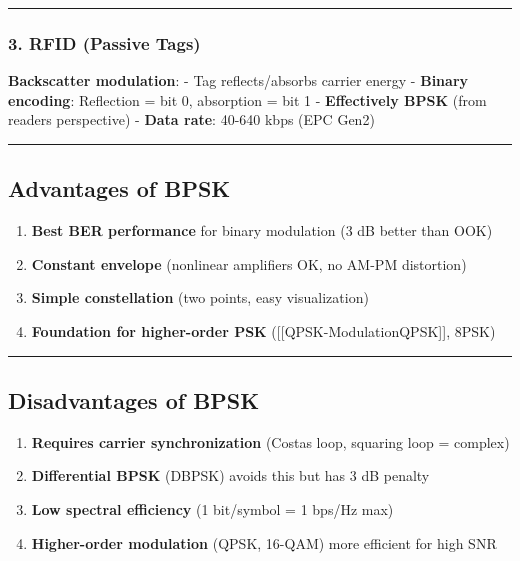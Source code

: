 \begin{center}\rule{0.5\linewidth}{0.5pt}\end{center}

\subsubsection{3. RFID (Passive Tags)}\label{rfid-passive-tags}

\textbf{Backscatter modulation}: - Tag reflects/absorbs carrier energy -
\textbf{Binary encoding}: Reflection = bit 0, absorption = bit 1 -
\textbf{Effectively BPSK} (from reader\textquotesingle s perspective) -
\textbf{Data rate}: 40-640 kbps (EPC Gen2)

\begin{center}\rule{0.5\linewidth}{0.5pt}\end{center}

\subsection{Advantages of BPSK}\label{advantages-of-bpsk}

\begin{enumerate}
\def\labelenumi{\arabic{enumi}.}
\tightlist
\item
  \textbf{Best BER performance} for binary modulation (3 dB better than
  OOK)
\item
  \textbf{Constant envelope} (nonlinear amplifiers OK, no AM-PM
  distortion)
\item
  \textbf{Simple constellation} (two points, easy visualization)
\item
  \textbf{Foundation for higher-order PSK}
  ({[}{[}QPSK-Modulation\textbar QPSK{]}{]}, 8PSK)
\end{enumerate}

\begin{center}\rule{0.5\linewidth}{0.5pt}\end{center}

\subsection{Disadvantages of BPSK}\label{disadvantages-of-bpsk}

\begin{enumerate}
\def\labelenumi{\arabic{enumi}.}
\tightlist
\item
  \textbf{Requires carrier synchronization} (Costas loop, squaring loop
  = complex)
\item
  \textbf{Differential BPSK} (DBPSK) avoids this but has 3 dB penalty
\item
  \textbf{Low spectral efficiency} (1 bit/symbol = 1 bps/Hz max)
\item
  \textbf{Higher-order modulation} (QPSK, 16-QAM) more efficient for
  high SNR
\end{enumerate}

